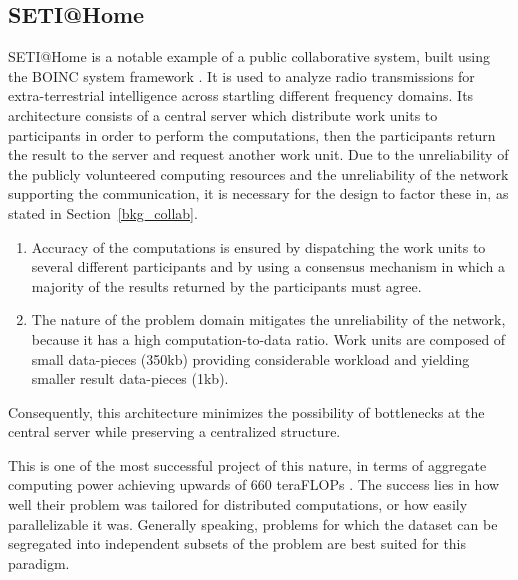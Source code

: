 \documentclass[12pt, titlepage]{uo_temp}
\begin{document}
     \subsection{SETI@Home}\label{bkg_seti}
     SETI@Home \cite{anderson2002seti} is a notable example of a public collaborative
     system, built using the BOINC system framework \cite{anderson2004boinc}.
     It is used to analyze radio transmissions for extra-terrestrial intelligence across
     startling different frequency domains.
     Its architecture consists of a central server which distribute work units to
     participants in order to perform the computations, then the participants return the
     result to the server and request another work unit.
     Due to the unreliability of the publicly volunteered computing resources and the
     unreliability of the network supporting the communication, it is necessary for the
     design to factor these in, as stated in Section~\ref{bkg_collab}.
     \begin{enumerate}
     \item Accuracy of the computations is ensured by dispatching the work units to
     several different participants and by using a consensus mechanism in which a majority
     of the results returned by the participants must agree.
     \item The nature of the problem domain mitigates the unreliability of the network,
       because it has a high computation-to-data ratio. Work units are composed of small
       data-pieces (350kb) providing considerable workload and yielding smaller result
       data-pieces (1kb).
     \end{enumerate}
     Consequently, this architecture minimizes the possibility of bottlenecks at the central
     server while preserving a centralized structure.

     This is one of the most successful project of this nature, in terms of aggregate
     computing power achieving upwards of 660 teraFLOPs \cite{wikiseti}. The success lies
     in how well their problem was tailored for distributed computations, or how easily
     parallelizable it was. Generally speaking, problems for which the dataset can be
     segregated into independent subsets of the problem are best suited for this
     paradigm.
\end{document}
